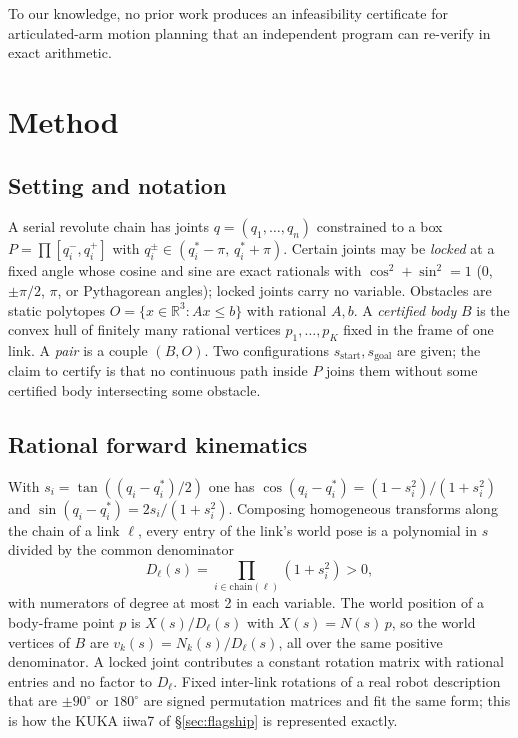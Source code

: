 \documentclass[10pt,twocolumn,letterpaper]{article}
\newcommand{\Rr}{\mathbb{R}}
\begin{document}
To our knowledge, no prior work produces an infeasibility certificate for articulated-arm motion planning that an independent program can re-verify in exact arithmetic.

\section{Method}\label{sec:method}

\subsection{Setting and notation}
A serial revolute chain has joints $q=(q_1,\dots,q_n)$ constrained to a box $P=\prod[q_i^-,q_i^+]$ with $q_i^\pm\in(q^*_i-\pi,\,q^*_i+\pi)$. Certain joints may be \emph{locked} at a fixed angle whose cosine and sine are exact rationals with $\cos^2+\sin^2=1$ (0, $\pm\pi/2$, $\pi$, or Pythagorean angles); locked joints carry no variable. Obstacles are static polytopes $O=\{x\in\Rr^3: Ax\le b\}$ with rational $A,b$. A \emph{certified body} $B$ is the convex hull of finitely many rational vertices $p_1,\dots,p_K$ fixed in the frame of one link. A \emph{pair} is a couple $(B,O)$. Two configurations $s_{\mathrm{start}},s_{\mathrm{goal}}$ are given; the claim to certify is that no continuous path inside $P$ joins them without some certified body intersecting some obstacle.

\subsection{Rational forward kinematics}
With $s_i=\tan((q_i-q^*_i)/2)$ one has $\cos(q_i-q^*_i)=(1-s_i^2)/(1+s_i^2)$ and $\sin(q_i-q^*_i)=2s_i/(1+s_i^2)$. Composing homogeneous transforms along the chain of a link $\ell$, every entry of the link's world pose is a polynomial in $s$ divided by the common denominator
\[
D_\ell(s)=\prod_{i\in\mathrm{chain}(\ell)}(1+s_i^2)>0,
\]
with numerators of degree at most 2 in each variable. The world position of a body-frame point $p$ is $X(s)/D_\ell(s)$ with $X(s)=N(s)\,p$, so the world vertices of $B$ are $v_k(s)=N_k(s)/D_\ell(s)$, all over the same positive denominator. A locked joint contributes a constant rotation matrix with rational entries and no factor to $D_\ell$. Fixed inter-link rotations of a real robot description that are $\pm90^\circ$ or $180^\circ$ are signed permutation matrices and fit the same form; this is how the KUKA iiwa7 of \S\ref{sec:flagship} is represented exactly.
\end{document}
